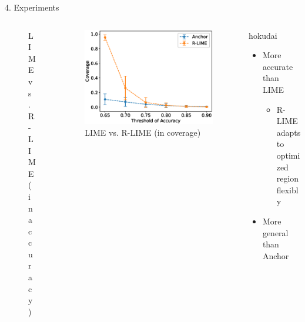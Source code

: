 \documentclass[unicode]{beamer}
\begin{document}
\begin{frame}
\begin{columns}[t]
\begin{column}{\lcol\textwidth}
\begin{block}{4. Experiments}
\begin{columns}
\begin{column}{\lcol\textwidth}
\begin{columns}[t]
\begin{column}{.509\textwidth}
\begin{figure}
                  \vspace{-0.4em}
                  \caption{LIME vs. R-LIME (in accuracy)}
                \end{figure}
              \end{column}
              \begin{column}{.491\textwidth}
                \begin{figure}
                  \includegraphics[width=.88\textwidth]{src/experiments/exp2/comp_cov}
                  \caption{LIME vs. R-LIME (in coverage)}
                \end{figure}
              \end{column}
            \end{columns}
          \end{column}
          \begin{column}{\rcol\textwidth}
            \vspace{0.5em}
            \begin{beamercolorbox}[colsep=0.1cm,rounded=true,shadow=true]{hokudai}
              \begin{itemize}
                \setlength{\itemsep}{0.3em}
                \setlength{\parskip}{0.2em}
                \item More accurate than LIME
                      \begin{itemize}
                        \item R-LIME adapts to optimized region flexibly
                      \end{itemize}
                \item More general than Anchor
                      \begin{itemize}

\end{itemize}
\end{itemize}
\end{beamercolorbox}
\end{column}
\end{columns}
\end{block}
\end{column}
\end{columns}
\end{frame}
\end{document}
